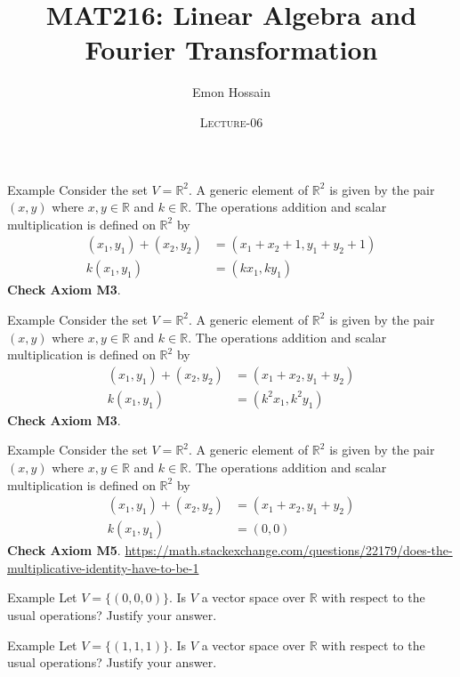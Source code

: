 \documentclass[11pt]{beamer}
\author[] %
{Emon Hossain\inst{1}}
\institute[University of Dhaka] %
{
  \inst{1}%
  Lecturer\\MNS department\\Brac University
}
\date[] %
{\textsc{Lecture-06}}
\title[]{MAT216: Linear Algebra and Fourier Transformation}
\theoremstyle{plain}
\begin{document}
\begin{frame}
\titlepage
\end{frame}


\begin{frame}{Example}
    Consider the set $V=\mathbb R^2$. A generic element of $\mathbb R^2$ is given by the pair $(x,y)$ where $x,y\in\mathbb R$ and $k\in\mathbb R$. The operations addition and scalar multiplication is defined on $\mathbb R^2$ by 
    \begin{align*}
        (x_1,y_1)+(x_2,y_2)&=(x_1+x_2+1,y_1+y_2+1)\\
        k(x_1,y_1) &= (kx_1,ky_1)
    \end{align*}
    \pause 
    \textbf{Check Axiom M3}.
\end{frame}

\begin{frame}{Example}
    Consider the set $V=\mathbb R^2$. A generic element of $\mathbb R^2$ is given by the pair $(x,y)$ where $x,y\in\mathbb R$ and $k\in\mathbb R$. The operations addition and scalar multiplication is defined on $\mathbb R^2$ by 
    \begin{align*}
        (x_1,y_1)+(x_2,y_2)&=(x_1+x_2,y_1+y_2)\\
        k(x_1,y_1) &= (k^2x_1,k^2y_1)
    \end{align*}
    \pause 
    \textbf{Check Axiom M3}.
\end{frame}

\begin{frame}{Example}
    Consider the set $V=\mathbb R^2$. A generic element of $\mathbb R^2$ is given by the pair $(x,y)$ where $x,y\in\mathbb R$ and $k\in\mathbb R$. The operations addition and scalar multiplication is defined on $\mathbb R^2$ by 
    \begin{align*}
        (x_1,y_1)+(x_2,y_2)&=(x_1+x_2,y_1+y_2)\\
        k(x_1,y_1) &= (0,0)
    \end{align*}
    \pause 
    \textbf{Check Axiom M5}. \url{https://math.stackexchange.com/questions/22179/does-the-multiplicative-identity-have-to-be-1}
\end{frame}

\begin{frame}{Example}
    Let $V=\{(0,0,0)\}$. Is $V$ a vector space over $\mathbb R$ with respect to the usual operations? Justify your answer. 
\end{frame}

\begin{frame}{Example}
    Let $V=\{(1,1,1)\}$. Is $V$ a vector space over $\mathbb R$ with respect to the usual operations? Justify your answer. 
\end{frame}
\end{document}
